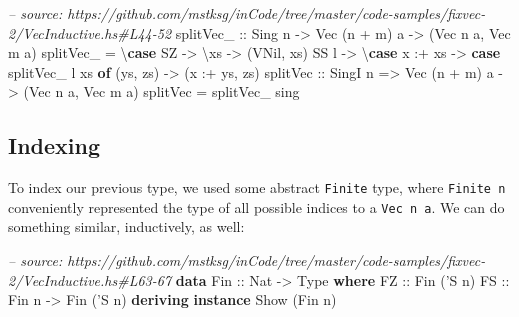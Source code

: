 \documentclass[]{article}
\newenvironment{Shaded}{}{}
\newcommand{\KeywordTok}[1]{\textcolor[rgb]{0.00,0.44,0.13}{\textbf{#1}}}
\newcommand{\DataTypeTok}[1]{\textcolor[rgb]{0.56,0.13,0.00}{#1}}
\newcommand{\CharTok}[1]{\textcolor[rgb]{0.25,0.44,0.63}{#1}}
\newcommand{\CommentTok}[1]{\textcolor[rgb]{0.38,0.63,0.69}{\textit{#1}}}
\newcommand{\OtherTok}[1]{\textcolor[rgb]{0.00,0.44,0.13}{#1}}
\newcommand{\FunctionTok}[1]{\textcolor[rgb]{0.02,0.16,0.49}{#1}}
\newcommand{\NormalTok}[1]{#1}
\begin{document}
\begin{Shaded}
\begin{Highlighting}[]
\CommentTok{-- source: https://github.com/mstksg/inCode/tree/master/code-samples/fixvec-2/VecInductive.hs#L44-52}
\OtherTok{splitVec_ ::} \DataTypeTok{Sing}\NormalTok{ n }\OtherTok{->} \DataTypeTok{Vec}\NormalTok{ (n }\FunctionTok{+}\NormalTok{ m) a }\OtherTok{->}\NormalTok{ (}\DataTypeTok{Vec}\NormalTok{ n a, }\DataTypeTok{Vec}\NormalTok{ m a)}
\NormalTok{splitVec_ }\FunctionTok{=}\NormalTok{ \textbackslash{}}\KeywordTok{case}
    \DataTypeTok{SZ}   \OtherTok{->}\NormalTok{ \textbackslash{}xs }\OtherTok{->}\NormalTok{ (}\DataTypeTok{VNil}\NormalTok{, xs)}
    \DataTypeTok{SS}\NormalTok{ l }\OtherTok{->}\NormalTok{ \textbackslash{}}\KeywordTok{case}
\NormalTok{      x }\FunctionTok{:+}\NormalTok{ xs }\OtherTok{->} \KeywordTok{case}\NormalTok{ splitVec_ l xs }\KeywordTok{of}
\NormalTok{        (ys, zs) }\OtherTok{->}\NormalTok{ (x }\FunctionTok{:+}\NormalTok{ ys, zs)}
\OtherTok{splitVec ::} \DataTypeTok{SingI}\NormalTok{ n }\OtherTok{=>} \DataTypeTok{Vec}\NormalTok{ (n }\FunctionTok{+}\NormalTok{ m) a }\OtherTok{->}\NormalTok{ (}\DataTypeTok{Vec}\NormalTok{ n a, }\DataTypeTok{Vec}\NormalTok{ m a)}
\NormalTok{splitVec }\FunctionTok{=}\NormalTok{ splitVec_ sing}
\end{Highlighting}
\end{Shaded}

\subsection{Indexing}\label{indexing-1}

To index our previous type, we used some abstract \texttt{Finite} type, where
\texttt{Finite\ n} conveniently represented the type of all possible indices to
a \texttt{Vec\ n\ a}. We can do something similar, inductively, as well:

\begin{Shaded}
\begin{Highlighting}[]
\CommentTok{-- source: https://github.com/mstksg/inCode/tree/master/code-samples/fixvec-2/VecInductive.hs#L63-67}
\KeywordTok{data} \DataTypeTok{Fin}\OtherTok{ ::} \DataTypeTok{Nat} \OtherTok{->} \DataTypeTok{Type} \KeywordTok{where}
    \DataTypeTok{FZ}\OtherTok{ ::} \DataTypeTok{Fin}\NormalTok{ (}\CharTok{'S n)}
    \DataTypeTok{FS}\OtherTok{ ::} \DataTypeTok{Fin}\NormalTok{ n }\OtherTok{->} \DataTypeTok{Fin}\NormalTok{ (}\CharTok{'S n)}
\KeywordTok{deriving} \KeywordTok{instance} \DataTypeTok{Show}\NormalTok{ (}\DataTypeTok{Fin}\NormalTok{ n)}
\end{Highlighting}
\end{Shaded}
\end{document}

